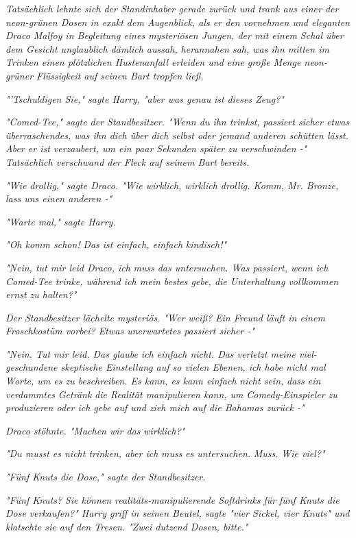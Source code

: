 {\emph{Tatsächlich lehnte sich der Standinhaber gerade zurück und trank aus einer der neon-grünen Dosen in exakt dem Augenblick, als er den vornehmen und eleganten Draco Malfoy in Begleitung eines mysteriösen Jungen, der mit einem Schal über dem Gesicht unglaublich dämlich aussah, herannahen sah, was ihn mitten im Trinken einen plötzlichen Hustenanfall erleiden und eine große Menge neon-grüner Flüssigkeit auf seinen Bart tropfen ließ.}

\emph{"'Tschuldigen Sie," sagte Harry, "aber was genau} \emph{\emph{ist}} \emph{dieses Zeug?"}

\emph{"Comed-Tee," sagte der Standbesitzer. "Wenn du ihn trinkst, passiert sicher etwas überraschendes, was ihn dich über dich selbst oder jemand anderen schütten lässt. Aber er ist verzaubert, um ein paar Sekunden später zu verschwinden -" Tatsächlich verschwand der Fleck auf seinem Bart} \emph{bereits.}

\emph{"Wie drollig," sagte Draco. "Wie wirklich, wirklich drollig. Komm, Mr. Bronze, lass uns einen anderen -"}

\emph{"Warte mal," sagte Harry.}

\emph{"\emph{Oh komm schon!}} \emph{Das ist einfach, einfach} \emph{\emph{kindisch!}"}

\emph{"Nein, tut mir leid Draco, ich} \emph{\emph{muss}} \emph{das untersuchen. Was passiert, wenn ich Comed-Tee trinke, während ich mein bestes gebe, die Unterhaltung vollkommen ernst zu halten?"}

\emph{Der Standbesitzer lächelte mysteriös. "Wer weiß? Ein Freund läuft in einem Froschkostüm vorbei? Etwas unerwartetes passiert sicher -"}

\emph{"Nein. Tut mir leid. Das glaube ich einfach nicht. Das verletzt meine viel-geschundene skeptische Einstellung auf so vielen Ebenen, ich habe nicht mal Worte, um es zu beschreiben. Es kann, es kann einfach} \emph{\emph{nicht sein,}} \emph{dass ein verdammtes} \emph{\emph{Getränk}} \emph{die Realität manipulieren kann, um} \emph{\emph{Comedy-Einspieler}} \emph{zu produzieren oder ich gebe auf und zieh mich auf die Bahamas zurück -"}

\emph{Draco stöhnte. "Machen wir das} \emph{\emph{wirklich?}"}

\emph{"Du musst es nicht trinken, aber ich} \emph{\emph{muss}} \emph{es untersuchen.} \emph{\emph{Muss.}} \emph{Wie viel?"}

\emph{"Fünf Knuts die Dose," sagte der Standbesitzer.}

\emph{"\emph{Fünf Knuts?}} \emph{Sie können realitäts-manipulierende Softdrinks für} \emph{\emph{fünf Knuts die Dose}} \emph{verkaufen?" Harry griff in seinen Beutel, sagte "vier Sickel, vier Knuts" und klatschte sie auf den Tresen. "Zwei dutzend Dosen, bitte."}

}
